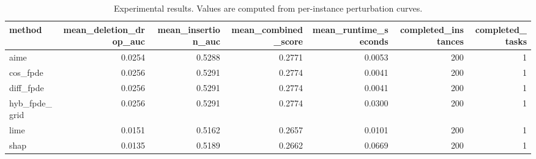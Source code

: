 \begin{table}[t]
\caption{Experimental results. Values are computed from per-instance perturbation curves.}
\label{tab:main_results_computed}
\centering
\begin{tabular}{lrrrrrr}
\toprule
method & mean\_deletion\_drop\_auc & mean\_insertion\_auc & mean\_combined\_score & mean\_runtime\_seconds & completed\_instances & completed\_tasks \\
\midrule
aime & 0.0254 & 0.5288 & 0.2771 & 0.0053 & 200 & 1 \\
cos\_fpde & 0.0256 & 0.5291 & 0.2774 & 0.0041 & 200 & 1 \\
diff\_fpde & 0.0256 & 0.5291 & 0.2774 & 0.0041 & 200 & 1 \\
hyb\_fpde\_grid & 0.0256 & 0.5291 & 0.2774 & 0.0300 & 200 & 1 \\
lime & 0.0151 & 0.5162 & 0.2657 & 0.0101 & 200 & 1 \\
shap & 0.0135 & 0.5189 & 0.2662 & 0.0669 & 200 & 1 \\
\bottomrule
\end{tabular}

\end{table}
